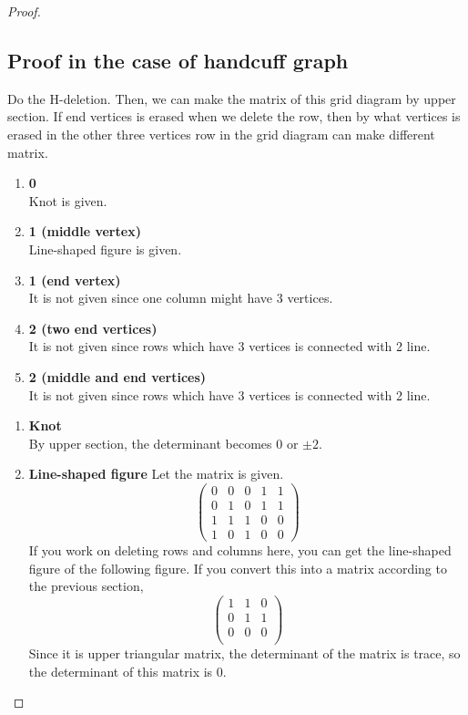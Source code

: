 \documentclass{article}
\theoremstyle{definition}
\begin{document}
\begin{proof}
\subsection{Proof in the case of handcuff graph}
Do the H-deletion. Then, we can make the matrix of this grid diagram by upper section. If end vertices is erased when we delete the row, then by what vertices is erased in the other three vertices row in the grid diagram can make different matrix.
\begin{enumerate}
    \item \textbf{0}\\
    Knot is given.
    \item \textbf{1 (middle vertex)}\\
    Line-shaped figure is given.
    \item \textbf{1 (end vertex)}\\
    It is not given since one column might have 3 vertices.
    \item \textbf{2 (two end vertices)}\\
    It is not given since rows which have 3 vertices is connected with 2 line.
    \item \textbf{2 (middle and end vertices)}\\
    It is not given since rows which have 3 vertices is connected with 2 line.
\end{enumerate}

\begin{enumerate}
    \item \textbf{Knot}\\
    By upper section, the determinant becomes 0 or $\pm 2$.
    \item \textbf{Line-shaped figure}
    Let the matrix is given.
    $$\begin{pmatrix}
        0 & 0 & 0 & 1 & 1\\
        0 & 1 & 0 & 1 & 1\\
        1 & 1 & 1 & 0 & 0\\
        1 & 0 & 1 & 0 & 0
    \end{pmatrix}$$
    If you work on deleting rows and columns here, you can get the line-shaped figure of the following figure. If you convert this into a matrix according to the previous section,
    $$\begin{pmatrix}
        1 & 1 & 0 \\
        0 & 1 & 1 \\
        0 & 0 & 0 \\
    \end{pmatrix}$$
    Since it is upper triangular matrix, the determinant of the matrix is trace, so the determinant of this matrix is 0.
\end{enumerate}
\end{proof}
\end{document}
